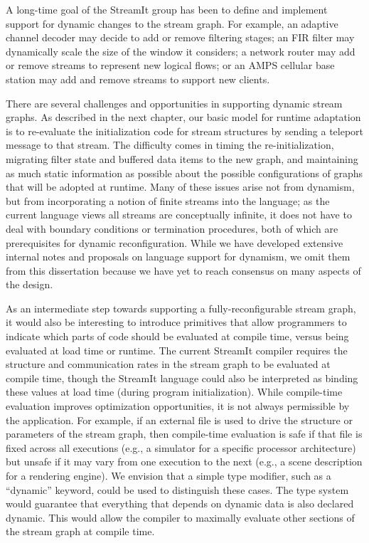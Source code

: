 \mybegin

  A long-time goal of
  the StreamIt group has been to define and implement support for
  dynamic changes to the stream graph.  For example, an adaptive
  channel decoder may decide to add or remove filtering stages; an FIR
  filter may dynamically scale the size of the window it considers; a
  network router may add or remove streams to represent new logical
  flows; or an AMPS cellular base station may add and remove streams
  to support new clients.

  There are several challenges and opportunities in supporting dynamic
  stream graphs.  As described in the next chapter, our basic model
  for runtime adaptation is to re-evaluate the initialization code for
  stream structures by sending a teleport message to that stream.  The
  difficulty comes in timing the re-initialization, migrating filter
  state and buffered data items to the new graph, and maintaining as
  much static information as possible about the possible
  configurations of graphs that will be adopted at runtime.  Many of
  these issues arise not from dynamism, but from incorporating a
  notion of finite streams into the language; as the current language
  views all streams are conceptually infinite, it does not have to
  deal with boundary conditions or termination procedures, both of
  which are prerequisites for dynamic reconfiguration.  While we have
  developed extensive internal notes and proposals on language support
  for dynamism, we omit them from this dissertation because we have
  yet to reach consensus on many aspects of the design.

  As an intermediate step towards supporting a fully-reconfigurable
  stream graph, it would also be interesting to introduce primitives
  that allow programmers to indicate which parts of code should be
  evaluated at compile time, versus being evaluated at load time or
  runtime.  The current StreamIt compiler requires the structure and
  communication rates in the stream graph to be evaluated at compile
  time, though the StreamIt language could also be interpreted as
  binding these values at load time (during program initialization).
  While compile-time evaluation improves optimization opportunities,
  it is not always permissible by the application.  For example, if an
  external file is used to drive the structure or parameters of the
  stream graph, then compile-time evaluation is safe if that file is
  fixed across all executions (e.g., a simulator for a specific
  processor architecture) but unsafe if it may vary from one execution
  to the next (e.g., a scene description for a rendering engine).  We
  envision that a simple type modifier, such as a ``dynamic'' keyword,
  could be used to distinguish these cases.  The type system would
  guarantee that everything that depends on dynamic data is also
  declared dynamic.  This would allow the compiler to maximally
  evaluate other sections of the stream graph at compile time.

